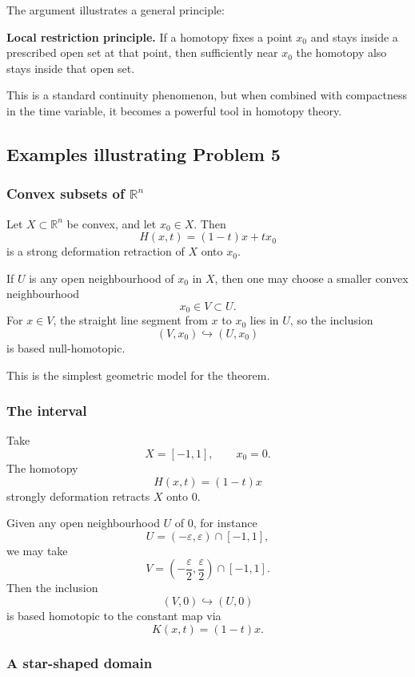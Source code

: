 \documentclass[12pt,a4paper]{article}
\theoremstyle{notespace}
\begin{document}
The argument illustrates a general principle:

\medskip

\textbf{Local restriction principle.}
If a homotopy fixes a point \(x_0\) and stays inside a prescribed open set at that point, then sufficiently near \(x_0\) the homotopy also stays inside that open set.

\medskip

This is a standard continuity phenomenon, but when combined with compactness in the time variable, it becomes a powerful tool in homotopy theory.

\subsection{Examples illustrating Problem 5}

\subsubsection{Convex subsets of \(\mathbb{R}^n\)}

Let \(X\subset \mathbb{R}^n\) be convex, and let \(x_0\in X\). Then
\[
H(x,t)=(1-t)x+tx_0
\]
is a strong deformation retraction of \(X\) onto \(x_0\).

If \(U\) is any open neighbourhood of \(x_0\) in \(X\), then one may choose a smaller convex neighbourhood
\[
x_0\in V\subset U.
\]
For \(x\in V\), the straight line segment from \(x\) to \(x_0\) lies in \(U\), so the inclusion
\[
(V,x_0)\hookrightarrow (U,x_0)
\]
is based null-homotopic.

This is the simplest geometric model for the theorem.

\subsubsection{The interval}

Take
\[
X=[-1,1],
\qquad
x_0=0.
\]
The homotopy
\[
H(x,t)=(1-t)x
\]
strongly deformation retracts \(X\) onto \(0\).

Given any open neighbourhood \(U\) of \(0\), for instance
\[
U=(-\varepsilon,\varepsilon)\cap [-1,1],
\]
we may take
\[
V=\left(-\frac{\varepsilon}{2},\frac{\varepsilon}{2}\right)\cap [-1,1].
\]
Then the inclusion
\[
(V,0)\hookrightarrow (U,0)
\]
is based homotopic to the constant map via
\[
K(x,t)=(1-t)x.
\]

\subsubsection{A star-shaped domain}
\end{document}
